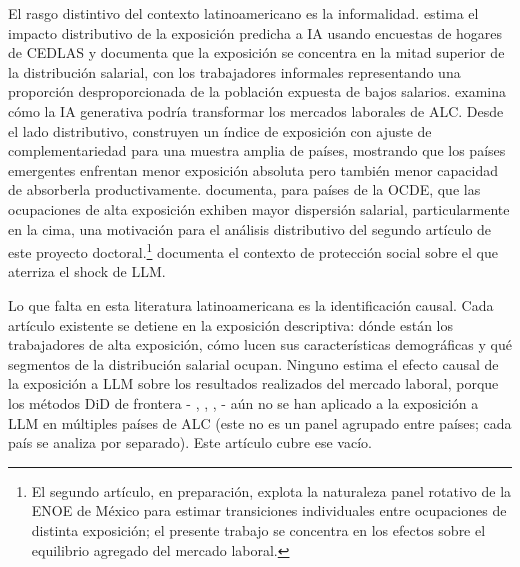 El rasgo distintivo del contexto latinoamericano es la informalidad. \citet{Ciaschi2025_distributive_ai} estima el impacto distributivo de la exposici\'{o}n predicha a IA usando encuestas de hogares de CEDLAS y documenta que la exposici\'{o}n se concentra en la mitad superior de la distribuci\'{o}n salarial, con los trabajadores informales representando una proporci\'{o}n desproporcionada de la poblaci\'{o}n expuesta de bajos salarios. \citet{EganadelSol2025_ai_lac} examina c\'{o}mo la IA generativa podr\'{i}a transformar los mercados laborales de ALC. Desde el lado distributivo, \citet{Pizzinelli2023_ai_exposure} construyen un \'{i}ndice de exposici\'{o}n con ajuste de complementariedad para una muestra amplia de pa\'{i}ses, mostrando que los pa\'{i}ses emergentes enfrentan menor exposici\'{o}n absoluta pero tambi\'{e}n menor capacidad de absorberla productivamente. \citet{Georgieff2024_ai_wage_inequality} documenta, para pa\'{i}ses de la OCDE, que las ocupaciones de alta exposici\'{o}n exhiben mayor dispersi\'{o}n salarial, particularmente en la cima, una motivaci\'{o}n para el an\'{a}lisis distributivo del segundo art\'{i}culo de este proyecto doctoral.\footnote{El segundo art\'{i}culo, en preparaci\'{o}n, explota la naturaleza panel rotativo de la ENOE de M\'{e}xico para estimar transiciones individuales entre ocupaciones de distinta exposici\'{o}n; el presente trabajo se concentra en los efectos sobre el equilibrio agregado del mercado laboral.} \citet{Brollo2024_social_protection} documenta el contexto de protecci\'{o}n social sobre el que aterriza el shock de LLM.

Lo que falta en esta literatura latinoamericana es la identificaci\'{o}n causal. Cada art\'{i}culo existente se detiene en la exposici\'{o}n descriptiva: d\'{o}nde est\'{a}n los trabajadores de alta exposici\'{o}n, c\'{o}mo lucen sus caracter\'{i}sticas demogr\'{a}ficas y qu\'{e} segmentos de la distribuci\'{o}n salarial ocupan. Ninguno estima el efecto causal de la exposici\'{o}n a LLM sobre los resultados realizados del mercado laboral, porque los m\'{e}todos DiD de frontera - \citet{CallawayS2021_did}, \citet{CallawayCGBS2024_continuous}, \citet{SunAbraham2021_eventstudy}, \citet{RambachanRoth2023_honest} - a\'{u}n no se han aplicado a la exposici\'{o}n a LLM en m\'{u}ltiples pa\'{i}ses de ALC (este no es un panel agrupado entre pa\'{i}ses; cada pa\'{i}s se analiza por separado). Este art\'{i}culo cubre ese vac\'{i}o.

\medskip

